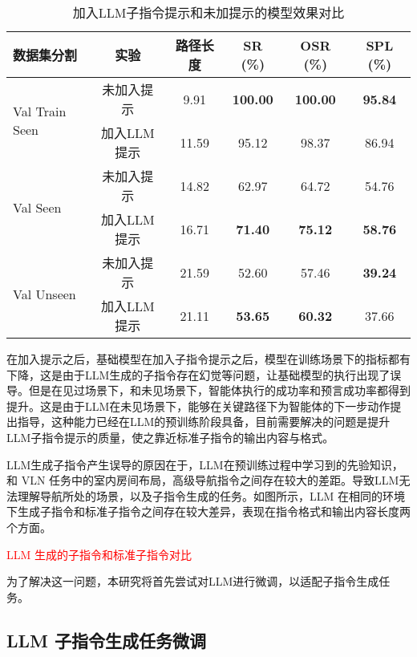 \documentclass[bachelor]{thesis-uestc}
\begin{document}
\begin{table}[htbp]
    \centering
    \caption{加入LLM子指令提示和未加提示的模型效果对比}
    \label{llms}
    \begin{tabular}{@{}lccccc@{}}
    \toprule
    \textbf{数据集分割} & \textbf{实验} & \textbf{路径长度} & \textbf{SR (\%)} & \textbf{OSR (\%)} & \textbf{SPL (\%)} \\ \midrule
    \multirow{2}{*}{Val Train Seen} & 未加入提示 & 9.91 & \textbf{100.00} & \textbf{100.00} & \textbf{95.84} \\
                                    & 加入LLM提示 & 11.59 & 95.12 & 98.37 & 86.94 \\ \midrule
    \multirow{2}{*}{Val Seen}       & 未加入提示 & 14.82 & 62.97 & 64.72 & 54.76 \\
                                    & 加入LLM提示 & 16.71 & \textbf{71.40} & \textbf{75.12} & \textbf{58.76} \\ \midrule
    \multirow{2}{*}{Val Unseen}     & 未加入提示 & 21.59 & 52.60 & 57.46 & \textbf{39.24} \\
                                    & 加入LLM提示 & 21.11 & \textbf{53.65} & \textbf{60.32} & 37.66 \\
    \bottomrule
    \end{tabular}
\end{table}

在加入提示之后，基础模型在加入子指令提示之后，模型在训练场景下的指标都有下降，这是由于LLM生成的子指令存在幻觉等问题，让基础模型的执行出现了误导。但是在见过场景下，和未见场景下，智能体执行的成功率和预言成功率都得到提升。这是由于LLM在未见场景下，能够在关键路径下为智能体的下一步动作提出指导，这种能力已经在LLM的预训练阶段具备，目前需要解决的问题是提升LLM子指令提示的质量，使之靠近标准子指令的输出内容与格式。

LLM生成子指令产生误导的原因在于，LLM在预训练过程中学习到的先验知识，和 VLN 任务中的室内房间布局，高级导航指令之间存在较大的差距。导致LLM无法理解导航所处的场景，以及子指令生成的任务。如图所示，LLM 在相同的环境下生成子指令和标准子指令之间存在较大差异，表现在指令格式和输出内容长度两个方面。

\textcolor{red}{LLM 生成的子指令和标准子指令对比}

为了解决这一问题，本研究将首先尝试对LLM进行微调，以适配子指令生成任务。

\subsection{LLM 子指令生成任务微调}
\end{document}
